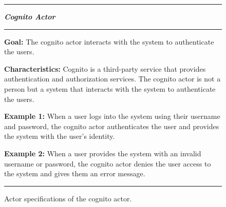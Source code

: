 \begin{figure}[H]
    \noindent
    \rule{\textwidth}{0.4pt}

    \begin{center}
        \noindent
        \textit{\textbf{Cognito Actor}}
    \end{center}

    \noindent
    \rule{\textwidth}{0.4pt}
    \noindent

    \textbf{Goal:} The cognito actor interacts with the system to authenticate the users.
    \newline
    \noindent

    \textbf{Characteristics:} Cognito is a third-party service that provides authentication and authorization services.
    The cognito actor is not a person but a system that interacts with the system to authenticate the users.
    \newline
    \noindent

    \textbf{Example 1:} When a user logs into the system using their username and password, the cognito actor
    authenticates the user and provides the system with the user's identity.
    \newline
    \noindent

    \textbf{Example 2:} When a user provides the system with an invalid username or password, the cognito actor
    denies the user access to the system and gives them an error message.

    \noindent
    \rule{\textwidth}{0.4pt}
    \caption{Actor specifications of the cognito actor.
    }\label{fig:actor-cognito}
\end{figure}
